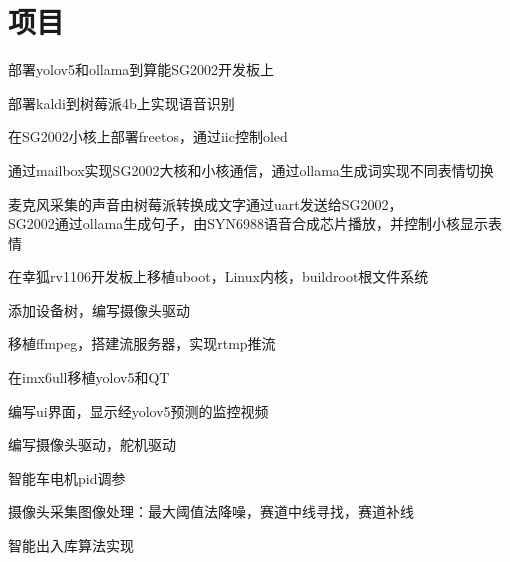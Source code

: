 \documentclass[]{deedy-resume-openfont}
\begin{document}
\begin{minipage}[t]{0.73\textwidth}
\section{项目}
\sectionsep
{}
\begin{tightemize}
    \item 部署yolov5和ollama到算能SG2002开发板上
    \item 部署kaldi到树莓派4b上实现语音识别
    \item 在SG2002小核上部署freetos，通过iic控制oled
    \item 通过mailbox实现SG2002大核和小核通信，通过ollama生成词实现不同表情切换
    \item 麦克风采集的声音由树莓派转换成文字通过uart发送给SG2002，
    \\SG2002通过ollama生成句子，由SYN6988语音合成芯片播放，并控制小核显示表情
    \end{tightemize}
\sectionsep

\begin{tightemize}
    \item 在幸狐rv1106开发板上移植uboot，Linux内核，buildroot根文件系统
    \item 添加设备树，编写摄像头驱动
    \item 移植ffmpeg，搭建流服务器，实现rtmp推流
    \item 在imx6ull移植yolov5和QT
    \item 编写ui界面，显示经yolov5预测的监控视频
    \end{tightemize}
\sectionsep

\begin{tightemize}
    \item 编写摄像头驱动，舵机驱动
    \item 智能车电机pid调参
    \item 摄像头采集图像处理：最大阈值法降噪，赛道中线寻找，赛道补线
    \item 智能出入库算法实现
    \end{tightemize}
\sectionsep


\end{minipage}
\end{document}
